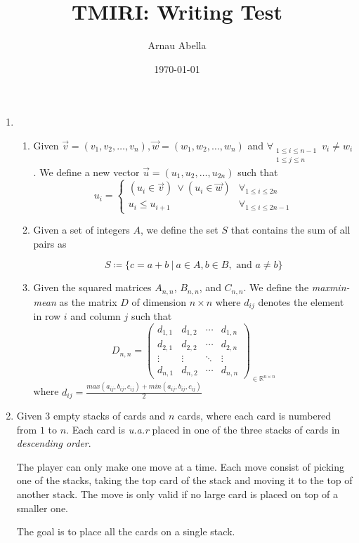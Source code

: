 \documentclass[12pt, a4paper]{article}
\title{%
  TMIRI: \Large{Writing Test}\\
}
\author{Arnau Abella}
\date{\today}
\begin{document}
\maketitle

\begin{enumerate}
  \item
    \begin{enumerate}
      \item Given $\vec{v} = (v_{1}, v_{2}, \ldots, v_{n}), \vec{w} = (w_{1}, w_{2}, \ldots, w_{n})$ and $\forall_{\substack{1 \leq i \leq n - 1\\1 \leq j \leq n}} \ v_i \neq w_i$. We define a new vector $\vec{u} = (u_{1}, u_{2}, \ldots, u_{2n})$ such that
        \[
           u_{i} = \begin{cases}
                 (u_{i}\in \vec{v}) \ \lor (u_{i}\in \vec{w})  & \forall_{1 \leq i \leq 2n }\\
                 u_{i}\leq u_{i+1} & \forall_{1 \leq i \leq 2n-1 }
              \end{cases}
       \]

      \item Given a set of integers $A$, we define the set $S$ that contains the sum of all pairs as

        \begin{equation*}
          S \coloneqq \{c = a + b \ | \ a \in A, b \in B, \text{ and } a \neq b\}
        \end{equation*}

      \item Given the squared matrices $A_{n,n}$, $B_{n,n}$, and $C_{n,n}$. We define the \mbox{\textit{maxmin-mean}} as the matrix $D$ of dimension $n \times n$ where $d_{ij}$ denotes the element in row $i$ and column $j$ such that
        \begin{equation*}
        D_{n,n} =
        \begin{pmatrix}
        d_{1,1} & d_{1,2} & \cdots & d_{1,n} \\
        d_{2,1} & d_{2,2} & \cdots & d_{2,n} \\
        \vdots  & \vdots  & \ddots & \vdots  \\
        d_{n,1} & d_{n,2} & \cdots & d_{n,n}
        \end{pmatrix}_{\in \mathbb{R}^{n \times n}}
        \end{equation*} where $d_{ij} = \frac{max(a_{ij}, b_{ij}, c_{ij}) + min(a_{ij}, b_{ij}, c_{ij})}{2}$
  \end{enumerate}
  \newpage
  \item Given $3$ empty stacks of cards and $n$ cards, where each card is numbered from $1$ to $n$. Each card is \textit{u.a.r} placed in one of the three stacks of cards in \textit{descending order}.

    The player can only make one move at a time. Each move consist of picking one of the stacks, taking the top card of the stack and moving it to the top of another stack. The move is only valid if no large card is placed on top of a smaller one.

    The goal is to place all the cards on a single stack.
\end{enumerate}
\end{document}
